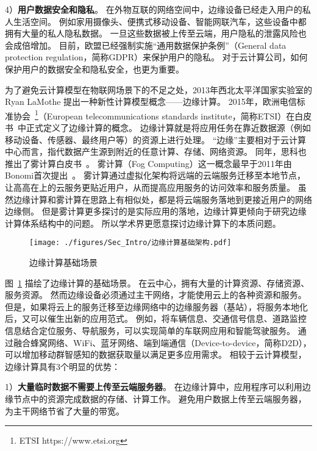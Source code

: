 4）\textbf{用户数据安全和隐私}。
在外物互联的网络空间中，边缘设备已经走入用户的私人生活空间。
例如家用摄像头、便携式移动设备、智能网联汽车，这些设备中都拥有大量的私人隐私数据。
一旦这些数据被上传至云端，用户隐私的泄露风险也会成倍增加。
目前，欧盟已经强制实施“通用数据保护条例”（General data protection regulation，简称GDPR）来保护用户的隐私。
对于云计算公司，如何保护用户的数据安全和隐私安全，也更为重要。

为了避免云计算模型在物联网场景下的不足之处，2013年西北太平洋国家实验室的 Ryan LaMothe 提出一种新性计算模型概念——边缘计算。
2015年，欧洲电信标准协会~\footnote{ETSI https://www.etsi.org}（European telecommunications standards institute，简称ETSI）在白皮书~\cite{hu2015mobile}中正式定义了边缘计算的概念。
边缘计算就是将应用任务在靠近数据源（例如移动设备、传感器、最终用户等）的资源上进行处理。
“边缘”主要相对于云计算中心而言，指代数据产生源到附近的任意计算、存储、网络资源。
同年，思科也推出了雾计算白皮书~\cite{computing2015internet}。
雾计算（Fog Computing）这一概念最早于2011年由Bonomi首次提出~\cite{bonomi2011connected}。
雾计算通过虚拟化架构将远端的云端服务迁移至本地节点，让高高在上的云服务更贴近用户，从而提高应用服务的访问效率和服务质量。
虽然边缘计算和雾计算在思路上有相似处，都是将云端服务落地到更接近用户的网络边缘侧。
但是雾计算更多探讨的是实际应用的落地，边缘计算更倾向于研究边缘计算体系结构中的问题。
所以学术界更愿意探讨边缘计算下的本质问题。

\begin{figure}[!h]
  \centering
  \texttt{[image: ./figures/Sec\_Intro/边缘计算基础架构.pdf]}
  \vspace{-0.5em}
  \caption{边缘计算基础场景}
  \vspace{-1em}
  \label{Figure_EC_Architecture}
\end{figure}

图~\ref{Figure_EC_Architecture} 描绘了边缘计算的基础场景。
在云中心，拥有大量的计算资源、存储资源、服务资源。
然而边缘设备必须通过主干网络，才能使用云上的各种资源和服务。
但是，如果将云上的服务迁移至边缘网络中的边缘服务器（基站），将服务本地化后，又可以催生出新的应用范式。
例如，将车辆信息、交通信号信息、道路监控信息结合定位服务、导航服务，可以实现简单的车联网应用和智能驾驶服务。
通过融合蜂窝网络、WiFi、蓝牙网络、端到端通信（Device-to-device，简称D2D），可以增加移动群智感知的数据获取量以满足更多应用需求。
相较于云计算模型，边缘计算具有3个明显的优势：

1）\textbf{大量临时数据不需要上传至云端服务器}。
在边缘计算中，应用程序可以利用边缘节点中的资源完成数据的存储、计算工作。
避免用户数据上传至云端服务器，为主干网络节省了大量的带宽。

